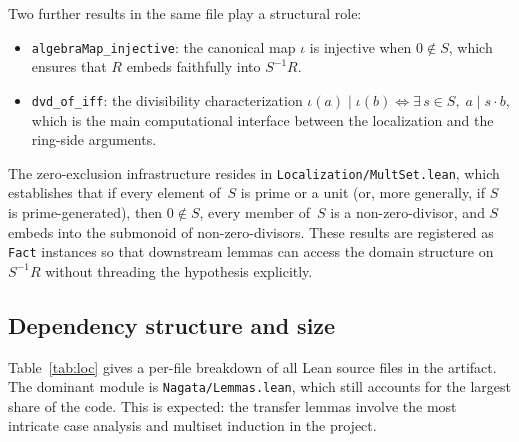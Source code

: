 \documentclass[11pt]{article}
\theoremstyle{plain}
\theoremstyle{definition}
\theoremstyle{remark}
\newcommand{\li}[1]{\texorpdfstring{\texttt{#1}}{#1}}
\newcommand{\lf}[1]{\texorpdfstring{\nolinkurl{#1}}{#1}}
\begin{document}
\noindent
Two further results in the same file play a structural role:
\begin{itemize}[nosep]
\item \li{algebraMap\_injective}: the canonical map $\iota$ is injective when
  $0\notin S$, which ensures that $R$ embeds faithfully into $S^{-1}R$.
\item \li{dvd\_of\_iff}: the divisibility characterization
  $\iota(a)\mid\iota(b) \Leftrightarrow \exists\,s\in S,\;a\mid s\cdot b$,
  which is the main computational interface between the localization and the
  ring-side arguments.
\end{itemize}

\noindent
The zero-exclusion infrastructure resides in \lf{Localization/MultSet.lean},
which establishes that if every element of~$S$ is prime or a unit (or, more
generally, if $S$ is prime-generated), then $0\notin S$, every member of~$S$
is a non-zero-divisor, and $S$ embeds into the submonoid of non-zero-divisors.
These results are registered as \li{Fact} instances so that downstream lemmas
can access the domain structure on~$S^{-1}R$ without threading the hypothesis
explicitly.

\subsection{Dependency structure and size}

Table~\ref{tab:loc} gives a per-file breakdown of all Lean source files in the
artifact.  The dominant module is \lf{Nagata/Lemmas.lean}, which still accounts
for the largest share of the code.  This is expected: the transfer lemmas
involve the most intricate case analysis and multiset induction in the project.
\end{document}
